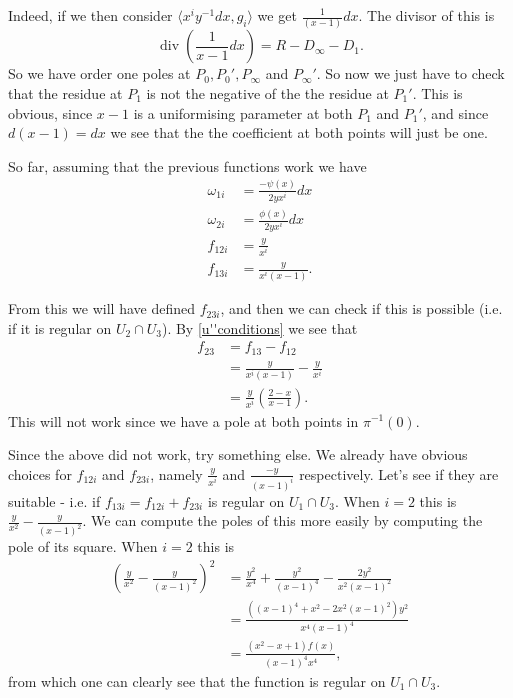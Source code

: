 \documentclass[draft, 11pt]{article} %
\theoremstyle{plain}
\theoremstyle{remark}
\DeclareMathOperator{\di}{div}
\begin{document}
Indeed, if we then consider $\langle x^iy^{-1}dx, g_i \rangle$ we get $\frac{1}{(x-1)}dx$.
The divisor of this is
\[
\di \left( \frac{1}{x-1}dx \right) = R - D_\infty - D_1.
\]
So we have order one poles at $P_0, P_0', P_\infty$ and $P_\infty'$.
So now we just have to check that the residue at $P_1$ is not the negative of the the residue at $P_1'$.
This is obvious, since $x-1$ is a uniformising parameter at both $P_1$ and $P_1'$, and since $d(x-1) = dx$ we see that the the coefficient at both points will just be one.

So far, assuming that the previous functions work we have
\begin{align*}
\omega_{1i} & = \frac{-\psi(x)}{2yx^i} dx \\
\omega_{2i} & = \frac{\phi(x)}{2yx^i} dx \\
f_{12i} & = \frac{y}{x^i} \\
f_{13i} & = \frac{y}{x^i(x-1)}.
\end{align*}

From this we will have defined $f_{23i}$, and then we can check if this is possible (i.e. if it is regular on $U_2 \cap U_3$).
By \eqref{u''conditions} we see that
\begin{align*}
f_{23} & = f_{13} - f_{12} \\
& = \frac{y}{x^i(x-1)} - \frac{y}{x^i} \\
& = \frac{y}{x^i} \left( \frac{2-x}{x-1} \right).
\end{align*}
This will not work since we have a pole at both points in $ \pi^{-1}(0)$.


Since the above did not work, try something else.
We already have obvious choices for $f_{12i}$ and $f_{23i}$, namely $\frac{y}{x^i}$ and $\frac{-y}{(x-1)^i}$ respectively.
Let's see if they are suitable - i.e. if $f_{13i}=f_{12i} + f_{23i}$ is regular on $U_1 \cap U_3$.
When $i=2$ this is $\frac{y}{x^2} - \frac{y}{(x-1)^2}$.
We can compute the poles of this more easily by computing the pole of its square.
When $i=2$ this is
\begin{align*}
\left( \frac{y}{x^2} - \frac{y}{(x-1)^2} \right)^2 & = \frac{y^2}{x^4} + \frac{y^2}{(x-1)^4} - \frac{2y^2}{x^2(x-1)^2} \\
& = \frac{((x-1)^4 + x^2 - 2x^2(x-1)^2)y^2}{x^4(x-1)^4} \\
& = \frac{(x^2-x+1)f(x)}{(x-1)^4x^4},
\end{align*}
from which one can clearly see that the function is regular on $U_1 \cap U_3$.
\end{document}
